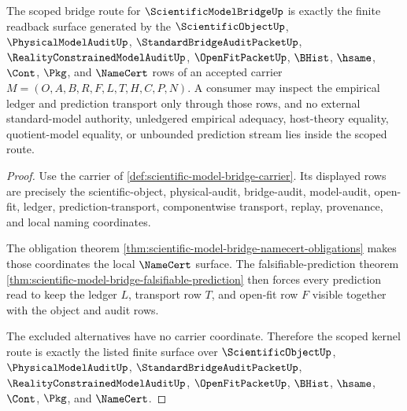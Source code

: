 \begin{theorem}
\label{thm:scientific-model-bridge-scoped-kernel-route}
The scoped bridge route for $\ScientificModelBridgeUp$ is exactly the finite readback surface generated by the $\ScientificObjectUp$, $\PhysicalModelAuditUp$, $\StandardBridgeAuditPacketUp$, $\RealityConstrainedModelAuditUp$, $\OpenFitPacketUp$, $\BHist$, $\hsame$, $\Cont$, $\Pkg$, and $\NameCert$ rows of an accepted carrier $M=(O,A,B,R,F,L,T,H,C,P,N)$. A consumer may inspect the empirical ledger and prediction transport only through those rows, and no external standard-model authority, unledgered empirical adequacy, host-theory equality, quotient-model equality, or unbounded prediction stream lies inside the scoped route.
\end{theorem}
\begin{proof}
Use the carrier of \autoref{def:scientific-model-bridge-carrier}. Its displayed rows are precisely the scientific-object, physical-audit, bridge-audit, model-audit, open-fit, ledger, prediction-transport, componentwise transport, replay, provenance, and local naming coordinates.

The obligation theorem \autoref{thm:scientific-model-bridge-namecert-obligations} makes those coordinates the local $\NameCert$ surface. The falsifiable-prediction theorem \autoref{thm:scientific-model-bridge-falsifiable-prediction} then forces every prediction read to keep the ledger $L$, transport row $T$, and open-fit row $F$ visible together with the object and audit rows.

The excluded alternatives have no carrier coordinate. Therefore the scoped kernel route is exactly the listed finite surface over $\ScientificObjectUp$, $\PhysicalModelAuditUp$, $\StandardBridgeAuditPacketUp$, $\RealityConstrainedModelAuditUp$, $\OpenFitPacketUp$, $\BHist$, $\hsame$, $\Cont$, $\Pkg$, and $\NameCert$.
\end{proof}



